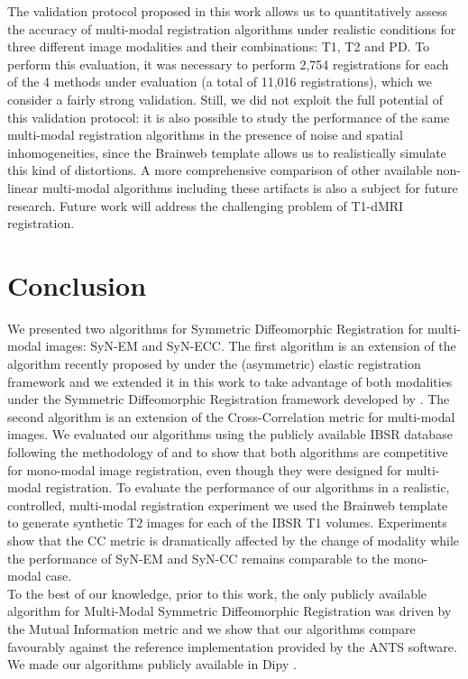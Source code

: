     The validation protocol proposed in this work allows us to quantitatively assess the accuracy of multi-modal registration algorithms under realistic conditions for three different image modalities and their combinations: T1, T2 and PD. To perform this evaluation, it was necessary to perform 2,754 registrations for each of the 4 methods under evaluation (a total of 11,016 registrations), which we consider a fairly strong validation. Still, we did not exploit the full potential of this validation protocol: it is also possible to study the performance of the same multi-modal registration algorithms in the presence of noise and spatial inhomogeneities, since the Brainweb template allows us to realistically simulate this kind of distortions. A more comprehensive comparison of other available non-linear multi-modal algorithms including these artifacts is also a subject for future research. Future work will address the challenging problem of T1-dMRI registration.


\section{Conclusion}
We presented two algorithms for Symmetric Diffeomorphic Registration for multi-modal images: SyN-EM and SyN-ECC. The first algorithm is an extension of the algorithm recently proposed by \cite{Arce-santana2014} under the (asymmetric) elastic registration framework and we extended it in this work to take advantage of both modalities under the Symmetric Diffeomorphic Registration framework developed by \cite{Avants2008, Avants2011}. The second algorithm is an extension of the Cross-Correlation metric for multi-modal images. We evaluated our algorithms using the publicly available IBSR database following the methodology of \cite{Klein2009, Klein2010} and \cite{Rohlfing2012} to show that both algorithms are competitive for mono-modal image registration, even though they were designed for multi-modal registration. To evaluate the performance of our algorithms in a realistic, controlled, multi-modal registration experiment we used the Brainweb \citep{Cocosco1997, Kwan1999} template to generate synthetic T2 images for each of the IBSR T1 volumes. Experiments show that the CC metric is dramatically affected by the change of modality while the performance of SyN-EM and SyN-CC remains comparable to the mono-modal case.\\

To the best of our knowledge, prior to this work, the only publicly available algorithm for Multi-Modal Symmetric Diffeomorphic Registration was driven by the Mutual Information metric and we show that our algorithms compare favourably against the reference implementation provided by the ANTS software. We made our algorithms
publicly available in Dipy \citep{Garyfallidis2014}.
